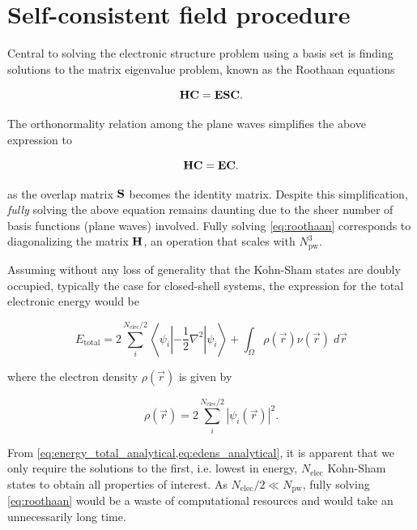 %
%
%
\section{Self-consistent field procedure}

Central to solving the electronic structure problem using a basis set is finding solutions to the matrix eigenvalue problem, known as the Roothaan equations

\begin{equation}
    \mathbf{H}\mathbf{C} = \mathbf{E}\mathbf{S}\mathbf{C}.
\end{equation}

The orthonormality relation among the plane waves simplifies the above expression to

\begin{equation}
    \mathbf{H}\mathbf{C} = \mathbf{E}\mathbf{C}.
    \label{eq:roothaan}
\end{equation}

as the overlap matrix $\mathbf{S}$ becomes the identity matrix. Despite this simplification, \textit{fully} solving the above equation remains daunting due to the sheer number of basis functions (plane waves) involved. Fully solving \cref{eq:roothaan} corresponds to diagonalizing the matrix $\mathbf{H}$, an operation that scales with $N_{\text{pw}}^{3}$. 

Assuming without any loss of generality that the Kohn-Sham states are doubly occupied, typically the case for closed-shell systems, the expression for the total electronic energy would be

\begin{equation}
    E_{\text{total}} = 2\sum_{i}^{N_{\text{elec}}/2} \left< \psi_{i} \left|-\frac{1}{2} \nabla^{2} \right| \psi_{i} \right> + \int_{\Omega} \rho(\vec{r}) \nu(\vec{r}) \; d\vec{r}
    \label{eq:energy_total_analytical}
\end{equation}

where the electron density $\rho(\vec{r})$ is given by

\begin{equation}
    \rho(\vec{r}) = 2\sum_{i}^{N_{\text{elec}}/2} |\psi_{i}(\vec{r})|^{2}.
    \label{eq:edens_analytical}
\end{equation}

From \cref{eq:energy_total_analytical,eq:edens_analytical}, it is apparent that we only require the solutions to the first, i.e. lowest in energy, $N_{\text{elec}}$ Kohn-Sham states to obtain all properties of interest. As $N_{\text{elec}}/2 \ll N_{\textrm{pw}}$, fully solving \cref{eq:roothaan} would be a waste of computational resources and would take an unnecessarily long time.

